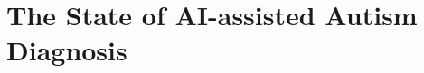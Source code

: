 \documentclass[letterpaper]{article}
\begin{document}










\section{The State of AI-assisted Autism Diagnosis}
\end{document}
